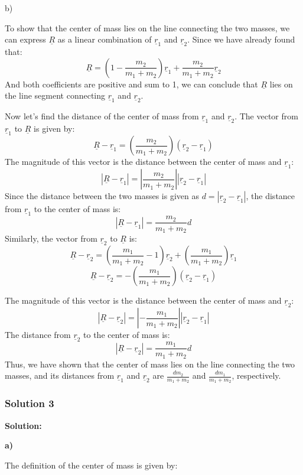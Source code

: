 \documentclass{article}
\begin{document}
b)

To show that the center of mass lies on the line connecting the two masses, we can express $\underline{R}$ as a linear combination of $\underline{r}_1$ and $\underline{r}_2$. Since we have already found that:
$$ \underline{R} = \left(1 - \frac{m_2}{m_1 + m_2}\right)\underline{r}_1 + \frac{m_2}{m_1 + m_2}\underline{r}_2 $$
And both coefficients are positive and sum to 1, we can conclude that $\underline{R}$ lies on the line segment connecting $\underline{r}_1$ and $\underline{r}_2$.

Now let's find the distance of the center of mass from $\underline{r}_1$ and $\underline{r}_2$. The vector from $\underline{r}_1$ to $\underline{R}$ is given by:
$$ \underline{R} - \underline{r}_1 = \left( \frac{m_2}{m_1 + m_2} \right) (\underline{r}_2 - \underline{r}_1) $$
The magnitude of this vector is the distance between the center of mass and $\underline{r}_1$:
$$ |\underline{R} - \underline{r}_1| = \left| \frac{m_2}{m_1 + m_2} \right| |\underline{r}_2 - \underline{r}_1| $$
Since the distance between the two masses is given as $d = |\underline{r}_2 - \underline{r}_1|$, the distance from $\underline{r}_1$ to the center of mass is:
$$ |\underline{R} - \underline{r}_1| = \frac{m_2}{m_1 + m_2} d $$
Similarly, the vector from $\underline{r}_2$ to $\underline{R}$ is:
$$ \underline{R} - \underline{r}_2 = \left( \frac{m_1}{m_1 + m_2} - 1 \right) \underline{r}_2 + \left( \frac{m_1}{m_1 + m_2} \right) \underline{r}_1 $$
$$ \underline{R} - \underline{r}_2 = -\left( \frac{m_1}{m_1 + m_2} \right) (\underline{r}_2 - \underline{r}_1) $$

The magnitude of this vector is the distance between the center of mass and $\underline{r}_2$:
$$ |\underline{R} - \underline{r}_2| = \left| -\frac{m_1}{m_1 + m_2} \right| |\underline{r}_2 - \underline{r}_1| $$
The distance from $\underline{r}_2$ to the center of mass is:
$$ |\underline{R} - \underline{r}_2| = \frac{m_1}{m_1 + m_2} d $$
Thus, we have shown that the center of mass lies on the line connecting the two masses, and its distances from $\underline{r}_1$ and $\underline{r}_2$ are $\frac{dm_2}{m_1 + m_2}$ and $\frac{dm_1}{m_1 + m_2}$, respectively.


\subsubsection{Solution 3}
\textbf{Solution:}

\textbf{a)}

The definition of the center of mass is given by:
\end{document}

